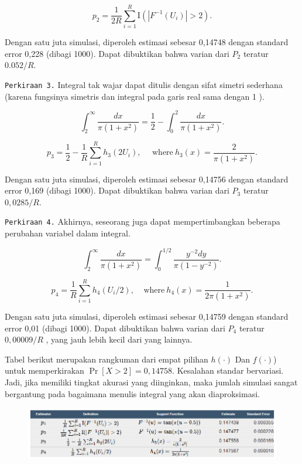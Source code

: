 \documentclass[
]{book}
\begin{document}
\[p_2 = \frac{1}{2R}\sum_{i=1}^R \mathrm{I}(|F^{-1}(U_i)|>2) .\]

Dengan satu juta simulasi, diperoleh estimasi sebesar 0,14748 dengan standard error 0,228 (dibagi 1000). Dapat dibuktikan bahwa varian dari \(P_2\) teratur \(0.052/R\).

\texttt{Perkiraan\ 3.} Integral tak wajar dapat ditulis dengan sifat simetri sederhana (karena fungsinya simetris dan integral pada garis real sama dengan 1 ).

\[\int_2^\infty \frac{dx}{\pi(1+x^2)}=\frac{1}{2}-\int_0^2\frac{dx}{\pi(1+x^2)} .\]

\[p_3 = \frac{1}{2}-\frac{1}{R}\sum_{i=1}^R h_3(2U_i), ~~~~~~\text{where}~h_3(x)=\frac{2}{\pi(1+x^2)} .\]

Dengan satu juta simulasi, diperoleh estimasi sebesar 0,14756 dengan standard error 0,169 (dibagi 1000). Dapat dibuktikan bahwa varian dari \(P_3\) teratur \(0,0285 / R\).

\texttt{Perkiraan\ 4.} Akhirnya, seseorang juga dapat mempertimbangkan beberapa perubahan variabel dalam integral.

\[\int_2^\infty \frac{dx}{\pi(1+x^2)}=\int_0^{1/2}\frac{y^{-2}dy}{\pi(1-y^{-2})} .\]

\[p_4 = \frac{1}{R}\sum_{i=1}^R h_4(U_i/2),~~~~~\text{where}~h_4(x)=\frac{1}{2\pi(1+x^2)} .\]

Dengan satu juta simulasi, diperoleh estimasi sebesar 0,14759 dengan standard error 0,01 (dibagi 1000). Dapat dibuktikan bahwa varian dari \(P_4\) teratur \(0,00009 / R\) , yang jauh lebih kecil dari yang lainnya.

Tabel berikut merupakan rangkuman dari empat pilihan \(h(\cdot)\) Dan \(f(\cdot)\)) untuk memperkirakan \(\Pr[X>2] = 0,14758\). Kesalahan standar bervariasi. Jadi, jika memiliki tingkat akurasi yang diinginkan, maka jumlah simulasi sangat bergantung pada bagaimana menulis integral yang akan diaproksimasi.

\begin{figure}

{\centering \includegraphics[width=1\linewidth]{images/6.1.3-3} 

}

\end{figure}
\end{document}
